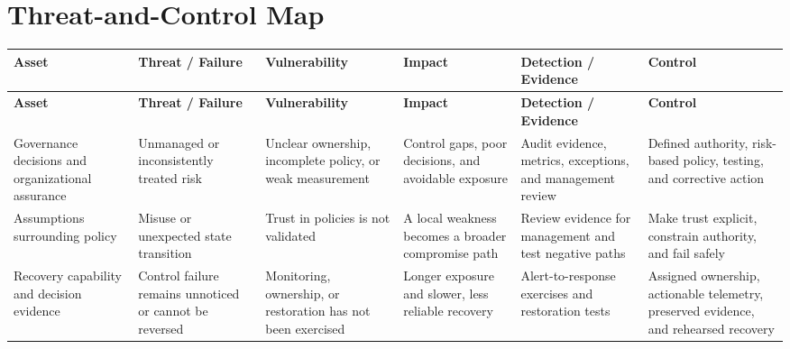 \documentclass[11pt]{article}
\begin{document}
\section*{Threat-and-Control Map}
\begingroup\scriptsize\setlength{\tabcolsep}{2pt}
\begin{longtable}{>{\RaggedRight\arraybackslash}p{}>{\RaggedRight\arraybackslash}p{}>{\RaggedRight\arraybackslash}p{}>{\RaggedRight\arraybackslash}p{}>{\RaggedRight\arraybackslash}p{}>{\RaggedRight\arraybackslash}p{}}
\toprule\rowcolor{Navy}\color{white}\textbf{Asset} & \color{white}\textbf{Threat / Failure} & \color{white}\textbf{Vulnerability} & \color{white}\textbf{Impact} & \color{white}\textbf{Detection / Evidence} & \color{white}\textbf{Control}\\\midrule
\endfirsthead
\toprule\rowcolor{Navy}\color{white}\textbf{Asset} & \color{white}\textbf{Threat / Failure} & \color{white}\textbf{Vulnerability} & \color{white}\textbf{Impact} & \color{white}\textbf{Detection / Evidence} & \color{white}\textbf{Control}\\\midrule
\endhead
Governance decisions and organizational assurance & Unmanaged or inconsistently treated risk & Unclear ownership, incomplete policy, or weak measurement & Control gaps, poor decisions, and avoidable exposure & Audit evidence, metrics, exceptions, and management review & Defined authority, risk-based policy, testing, and corrective action\\\midrule
Assumptions surrounding policy & Misuse or unexpected state transition & Trust in policies is not validated & A local weakness becomes a broader compromise path & Review evidence for management and test negative paths & Make trust explicit, constrain authority, and fail safely\\\midrule
Recovery capability and decision evidence & Control failure remains unnoticed or cannot be reversed & Monitoring, ownership, or restoration has not been exercised & Longer exposure and slower, less reliable recovery & Alert-to-response exercises and restoration tests & Assigned ownership, actionable telemetry, preserved evidence, and rehearsed recovery\\\midrule
\bottomrule
\end{longtable}
\endgroup
\end{document}
